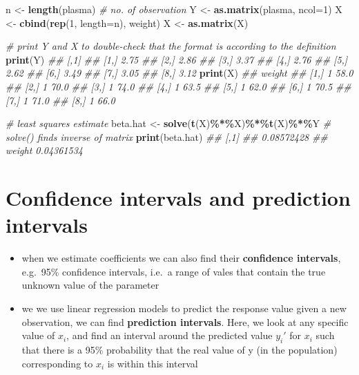 \documentclass[
]{book}
\newenvironment{Shaded}{\begin{snugshade}}{\end{snugshade}}
\newcommand{\CommentTok}[1]{\textcolor[rgb]{0.56,0.35,0.01}{\textit{#1}}}
\newcommand{\DataTypeTok}[1]{\textcolor[rgb]{0.13,0.29,0.53}{#1}}
\newcommand{\DecValTok}[1]{\textcolor[rgb]{0.00,0.00,0.81}{#1}}
\newcommand{\KeywordTok}[1]{\textcolor[rgb]{0.13,0.29,0.53}{\textbf{#1}}}
\newcommand{\NormalTok}[1]{#1}
\newcommand{\OperatorTok}[1]{\textcolor[rgb]{0.81,0.36,0.00}{\textbf{#1}}}
\newcommand{\StringTok}[1]{\textcolor[rgb]{0.31,0.60,0.02}{#1}}
\providecommand{\tightlist}{%
  \setlength{\itemsep}{0pt}\setlength{\parskip}{0pt}}
\theoremstyle{definition}
\theoremstyle{definition}
\theoremstyle{definition}
\theoremstyle{remark}
\begin{document}
\begin{Shaded}
\begin{Highlighting}[]
\NormalTok{n \textless{}{-}}\StringTok{ }\KeywordTok{length}\NormalTok{(plasma) }\CommentTok{\# no. of observation}
\NormalTok{Y \textless{}{-}}\StringTok{ }\KeywordTok{as.matrix}\NormalTok{(plasma, }\DataTypeTok{ncol=}\DecValTok{1}\NormalTok{)}
\NormalTok{X \textless{}{-}}\StringTok{ }\KeywordTok{cbind}\NormalTok{(}\KeywordTok{rep}\NormalTok{(}\DecValTok{1}\NormalTok{, }\DataTypeTok{length=}\NormalTok{n), weight)}
\NormalTok{X \textless{}{-}}\StringTok{ }\KeywordTok{as.matrix}\NormalTok{(X)}

\CommentTok{\# print Y and X to double{-}check that the format is according to the definition}
\KeywordTok{print}\NormalTok{(Y) }
\CommentTok{\#\#      [,1]}
\CommentTok{\#\# [1,] 2.75}
\CommentTok{\#\# [2,] 2.86}
\CommentTok{\#\# [3,] 3.37}
\CommentTok{\#\# [4,] 2.76}
\CommentTok{\#\# [5,] 2.62}
\CommentTok{\#\# [6,] 3.49}
\CommentTok{\#\# [7,] 3.05}
\CommentTok{\#\# [8,] 3.12}
\KeywordTok{print}\NormalTok{(X) }
\CommentTok{\#\#        weight}
\CommentTok{\#\# [1,] 1   58.0}
\CommentTok{\#\# [2,] 1   70.0}
\CommentTok{\#\# [3,] 1   74.0}
\CommentTok{\#\# [4,] 1   63.5}
\CommentTok{\#\# [5,] 1   62.0}
\CommentTok{\#\# [6,] 1   70.5}
\CommentTok{\#\# [7,] 1   71.0}
\CommentTok{\#\# [8,] 1   66.0}

\CommentTok{\# least squares estimate}
\NormalTok{beta.hat \textless{}{-}}\StringTok{ }\KeywordTok{solve}\NormalTok{(}\KeywordTok{t}\NormalTok{(X)}\OperatorTok{\%*\%}\NormalTok{X)}\OperatorTok{\%*\%}\KeywordTok{t}\NormalTok{(X)}\OperatorTok{\%*\%}\NormalTok{Y }\CommentTok{\# solve() finds inverse of matrix}
\KeywordTok{print}\NormalTok{(beta.hat)}
\CommentTok{\#\#              [,1]}
\CommentTok{\#\#        0.08572428}
\CommentTok{\#\# weight 0.04361534}
\end{Highlighting}
\end{Shaded}

\hypertarget{confidence-intervals-and-prediction-intervals}{%
\section{Confidence intervals and prediction intervals}\label{confidence-intervals-and-prediction-intervals}}

\begin{itemize}
\tightlist
\item
  when we estimate coefficients we can also find their \textbf{confidence intervals}, e.g.~95\% confidence intervals, i.e.~a range of vales that contain the true unknown value of the parameter
\item
  we we use linear regression models to predict the response value given a new observation, we can find \textbf{prediction intervals}. Here, we look at any specific value of \(x_i\), and find an interval around the predicted value \(y_i'\) for \(x_i\) such that there is a 95\% probability that the real value of y (in the population) corresponding to \(x_i\) is within this interval
\end{itemize}
\end{document}
